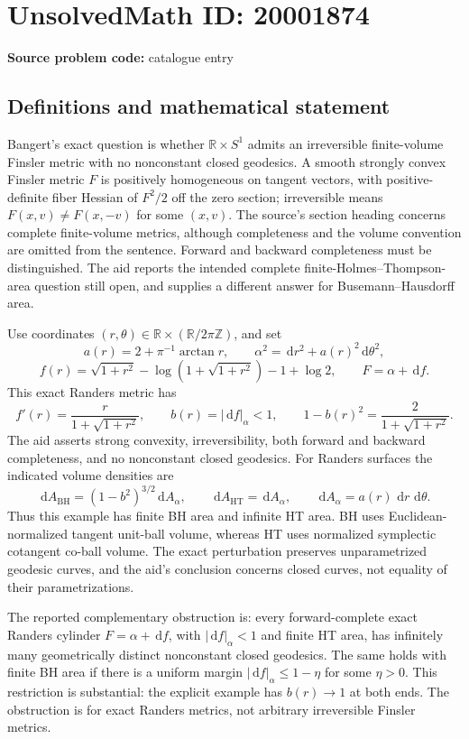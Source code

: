 \documentclass[11pt]{article}
\newcommand{\Z}{\mathbb{Z}}
\newcommand{\R}{\mathbb{R}}
\newcommand{\dd}{\,\mathrm{d}}
\begin{document}
\section*{UnsolvedMath ID: 20001874}
\textbf{Source problem code:} catalogue entry
\subsection{Definitions and mathematical statement}
Bangert's exact question is whether \(\R\times S^1\) admits an irreversible finite-volume Finsler metric with no nonconstant closed geodesics. A smooth strongly convex Finsler metric \(F\) is positively homogeneous on tangent vectors, with positive-definite fiber Hessian of \(F^2/2\) off the zero section; irreversible means \(F(x,v)\ne F(x,-v)\) for some \((x,v)\). The source's section heading concerns complete finite-volume metrics, although completeness and the volume convention are omitted from the sentence. Forward and backward completeness must be distinguished. The aid reports the intended complete finite-Holmes--Thompson-area question still open, and supplies a different answer for Busemann--Hausdorff area.

Use coordinates \((r,\theta)\in\R\times(\R/2\pi\Z)\), and set
\[
 a(r)=2+\pi^{-1}\arctan r,\qquad
 \alpha^2=\dd r^2+a(r)^2\dd\theta^2,
\]
\[
 f(r)=\sqrt{1+r^2}-\log(1+\sqrt{1+r^2})-1+\log2,
 \qquad F=\alpha+\dd f.
\]
This exact Randers metric has
\[
 f'(r)=\frac{r}{1+\sqrt{1+r^2}},\qquad
 b(r)=|\dd f|_\alpha<1,\qquad
 1-b(r)^2=\frac2{1+\sqrt{1+r^2}}.
\]
The aid asserts strong convexity, irreversibility, both forward and backward completeness, and no nonconstant closed geodesics. For Randers surfaces the indicated volume densities are
\[
 \dd A_{\mathrm{BH}}=(1-b^2)^{3/2}\dd A_\alpha,
 \qquad \dd A_{\mathrm{HT}}=\dd A_\alpha,
 \qquad \dd A_\alpha=a(r)\,\dd r\,\dd\theta.
\]
Thus this example has finite BH area and infinite HT area. BH uses Euclidean-normalized tangent unit-ball volume, whereas HT uses normalized symplectic cotangent co-ball volume. The exact perturbation preserves unparametrized geodesic curves, and the aid's conclusion concerns closed curves, not equality of their parametrizations.

The reported complementary obstruction is: every forward-complete exact Randers cylinder \(F=\alpha+\dd f\), with \(|\dd f|_\alpha<1\) and finite HT area, has infinitely many geometrically distinct nonconstant closed geodesics. The same holds with finite BH area if there is a uniform margin \(|\dd f|_\alpha\leq1-\eta\) for some \(\eta>0\). This restriction is substantial: the explicit example has \(b(r)\to1\) at both ends. The obstruction is for exact Randers metrics, not arbitrary irreversible Finsler metrics.
\end{document}
